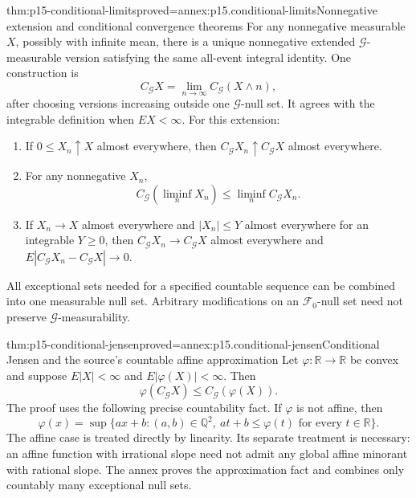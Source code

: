 \begin{hbtheorem}{thm:p15-conditional-limits}{proved=annex:p15.conditional-limits}{Nonnegative extension and conditional convergence theorems}
For any nonnegative measurable \(X\), possibly with infinite mean,
there is a unique nonnegative extended \(\mathcal G\)-measurable version
satisfying the same all-event integral identity. One construction is
\[
                   C_{\mathcal G}X=\lim_{n\to\infty}C_{\mathcal G}(X\wedge n),
\]
after choosing versions increasing outside one \(\mathcal G\)-null set.
It agrees with the integrable definition when \(EX<\infty\).
For this extension:
\begin{enumerate}
\item If \(0\leq X_n\uparrow X\) almost everywhere, then
      \(C_{\mathcal G}X_n\uparrow C_{\mathcal G}X\) almost everywhere.
\item For any nonnegative \(X_n\),
      \[
       C_{\mathcal G}(\liminf_n X_n)\leq\liminf_n C_{\mathcal G}X_n.
      \]
\item If \(X_n\to X\) almost everywhere and \(|X_n|\leq Y\) almost
      everywhere for an integrable \(Y\geq0\), then
      \(C_{\mathcal G}X_n\to C_{\mathcal G}X\) almost everywhere and
      \(E|C_{\mathcal G}X_n-C_{\mathcal G}X|\to0\).
\end{enumerate}
All exceptional sets needed for a specified countable sequence can be
combined into one measurable null set. Arbitrary modifications on an
\(\mathcal F_0\)-null set need not preserve \(\mathcal G\)-measurability.
\end{hbtheorem}

\begin{hbtheorem}{thm:p15-conditional-jensen}{proved=annex:p15.conditional-jensen}{Conditional Jensen and the source's countable affine approximation}
Let \(\varphi:\mathbb R\to\mathbb R\) be convex and suppose
\(E|X|<\infty\) and \(E|\varphi(X)|<\infty\). Then
\[
                   \varphi(C_{\mathcal G}X)
                          \leq C_{\mathcal G}(\varphi(X)).
\]
The proof uses the following precise countability fact. If \(\varphi\)
is not affine, then
\[
 \varphi(x)=\sup\{ax+b:(a,b)\in\mathbb Q^2,\ 
                           at+b\leq\varphi(t)\text{ for every }t\in\mathbb R\}.
\]
The affine case is treated directly by linearity. Its separate treatment
is necessary: an affine function with irrational slope need not admit
any global affine minorant with rational slope.
The annex proves the approximation fact and combines only countably
many exceptional null sets.
\end{hbtheorem}


